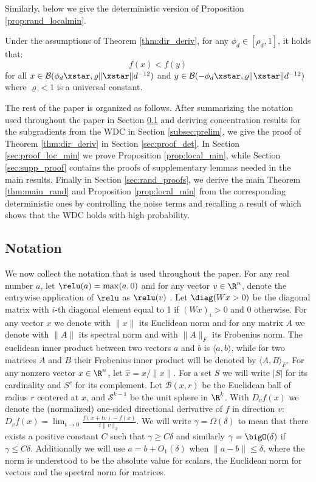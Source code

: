 Similarly, below we give the deterministic version of Proposition \ref{prop:rand_localmin}.
\begin{prop}\label{prop:local_min}
	Under the assumptions of Theorem \ref{thm:dir_deriv}, for any $\phi_d \in [\rho_d, 1]$, it holds that:
	\begin{equation}\label{eq:localmin}
	f(x) < f(y)
	\end{equation}
	for all $x \in \mathcal{B}(\phi_d \xstar, \varrho \|\xstar\| d^{-12})$ and $y \in \mathcal{B}(- \phi_d \xstar, \varrho  \|\xstar\| d^{-12})$ where $\varrho<1$ is a universal constant.
\end{prop}

The rest of the paper is organized as follows.
After summarizing the notation used throughout the paper in 
Section \ref{sec:Notation} and deriving concentration results for the subgradients from the WDC in Section \ref{subsec:prelim}, we give the proof of Theorem \ref{thm:dir_deriv} in Section \ref{sec:proof_det}. In Section
\ref{sec:proof_loc_min} we prove Proposition \ref{prop:local_min}, while Section
\ref{sec:supp_proof} contains the proofs of supplementary lemmas needed in the main results. 
Finally in Section \ref{sec:rand_proofs}, we derive the main Theorem \ref{thm:main_rand} and Proposition \ref{prop:local_min} from the corresponding deterministic ones by
controlling the noise terms and recalling a result of \cite{hand2017global} which shows that the WDC holds with high probability.

\subsection{Notation}\label{sec:Notation}

We now collect the notation that is used throughout the paper.  For any real number $a$, let $\relu(a) = \max(a, 0)$ and for any vector $v \in \R^n$, denote the entrywise application of $\relu$ as $\relu(v)$ . Let $\diag(W x > 0)$ be the diagonal matrix with $i$-th diagonal element equal to 1 if $(Wx)_i > 0$ and 0 otherwise.
For any vector $x$ we denote with $\|x\|$ its Euclidean norm 
and for any matrix  $A$ we denote with $\|A\|$ its spectral norm and with $\|A\|_F$ its Frobenius norm. The euclidean inner product between two vectors $a$ and $b$ is $\langle a,b \rangle$, while for 
two matrices $A$ and $B$ their Frobenius inner product will be denoted by $\langle A, B\rangle_F$.
For any nonzero vector $x \in \R^n$, let $\hat{x} = x/\|x\|$.  For a set $S$ we will write $|S|$ for its cardinality and $S^c$ for its complement.
Let $\mathcal{B}(x,r)$ be the Euclidean ball of radius $r$ centered at $x$, and $\mathcal{S}^{k-1}$ be the unit sphere in $\R^k$.
With $D_v f(x)$ we denote the (normalized) one-sided directional derivative of $f$ in direction $v$: $D_{v} f(x) = \lim_{t \to 0} \frac{f(x + t v) - f(x)}{t \|v\|_2}$.
We will write $\gamma = \Omega(\delta)$ to mean that 
there exists a positive constant $C$ such that $\gamma \geq C \delta$ and similarly $\gamma = \bigO(\delta)$ if $\gamma \leq C \delta$. Additionally we will use $a = b + O_1(\delta)$ when 
$\|a - b\| \leq \delta$, where the norm is understood to be the absolute value for scalars, the Euclidean norm for vectors and the spectral norm for matrices.

